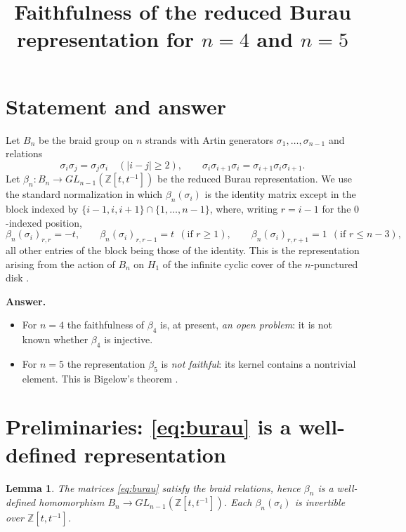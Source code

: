 \documentclass{amsart}
\newtheorem{lemma}{Lemma}
\theoremstyle{remark}
\begin{document}
\title{Faithfulness of the reduced Burau representation for $n=4$ and $n=5$}
\maketitle

\section*{Statement and answer}

Let $B_n$ be the braid group on $n$ strands with Artin generators
$\sigma_1,\dots,\sigma_{n-1}$ and relations
\[
\sigma_i\sigma_j=\sigma_j\sigma_i \quad(|i-j|\ge 2),\qquad
\sigma_i\sigma_{i+1}\sigma_i=\sigma_{i+1}\sigma_i\sigma_{i+1}.
\]
Let $\beta_n:B_n\to GL_{n-1}(\mathbb Z[t,t^{-1}])$ be the reduced Burau
representation. We use the standard normalization in which $\beta_n(\sigma_i)$
is the identity matrix except in the block indexed by
$\{i-1,i,i+1\}\cap\{1,\dots,n-1\}$, where, writing $r=i-1$ for the $0$-indexed
position,
\begin{equation}\label{eq:burau}
\beta_n(\sigma_i)_{r,r}=-t,\qquad
\beta_n(\sigma_i)_{r,r-1}=t \ \ (\text{if }r\ge 1),\qquad
\beta_n(\sigma_i)_{r,r+1}=1 \ \ (\text{if }r\le n-3),
\end{equation}
all other entries of the block being those of the identity. This is the
representation arising from the action of $B_n$ on $H_1$ of the infinite
cyclic cover of the $n$-punctured disk \cite[\S3.3]{KasselTuraev}.

\medskip
\noindent\textbf{Answer.}
\begin{itemize}
\item[(a)] For $n=4$ the faithfulness of $\beta_4$ is, at present,
\emph{an open problem}: it is not known whether $\beta_4$ is injective.
\item[(b)] For $n=5$ the representation $\beta_5$ is \emph{not faithful}:
its kernel contains a nontrivial element. This is Bigelow's theorem
\cite{Bigelow1999}.
\end{itemize}

\section{Preliminaries: \texorpdfstring{\eqref{eq:burau}}{(1)} is a well-defined representation}

\begin{lemma}\label{lem:rep}
The matrices \eqref{eq:burau} satisfy the braid relations, hence
$\beta_n$ is a well-defined homomorphism $B_n\to GL_{n-1}(\mathbb Z[t,t^{-1}])$.
Each $\beta_n(\sigma_i)$ is invertible over $\mathbb Z[t,t^{-1}]$.
\end{lemma}
\end{document}
